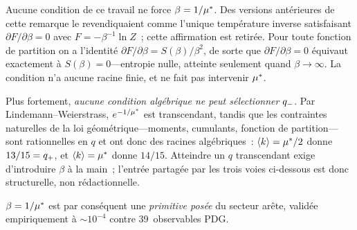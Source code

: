 \documentclass[12pt,a4paper]{article}
\begin{document}
\begin{remarque}
\label{rem:gibbs_derivation}
Aucune condition de ce travail ne force $\beta = 1/{\mu^{*}}$. Des
versions antérieures de cette remarque le revendiquaient comme
l'unique température inverse satisfaisant
$\partial F/\partial\beta = 0$ avec $F = -\beta^{-1}\ln Z$~; cette
affirmation est retirée. Pour toute fonction de partition on a
l'identité $\partial F/\partial\beta = S(\beta)/\beta^{2}$, de sorte
que $\partial F/\partial\beta = 0$ équivaut exactement à
$S(\beta) = 0$---entropie nulle, atteinte seulement quand
$\beta \to \infty$. La condition n'a aucune racine finie, et ne fait
pas intervenir ${\mu^{*}}$.

Plus fortement, \emph{aucune condition algébrique ne peut sélectionner}
$q_{-}$. Par Lindemann--Weierstrass, $e^{-1/{\mu^{*}}}$ est
transcendant, tandis que les contraintes naturelles de la loi
géométrique---moments, cumulants, fonction de partition---sont
rationnelles en $q$ et ont donc des racines algébriques~:
$\langle k\rangle = {\mu^{*}}/2$ donne $13/15 = q_{+}$, et
$\langle k\rangle = {\mu^{*}}$ donne $14/15$. Atteindre un $q$
transcendant exige d'introduire $\beta$ à la main~; l'entrée partagée
par les trois voies ci-dessous est donc structurelle, non rédactionnelle.

$\beta = 1/{\mu^{*}}$ est par conséquent une \emph{primitive posée} du
secteur arête, validée empiriquement à $\sim 10^{-4}$ contre
39~observables PDG.
\end{remarque}
\end{document}
